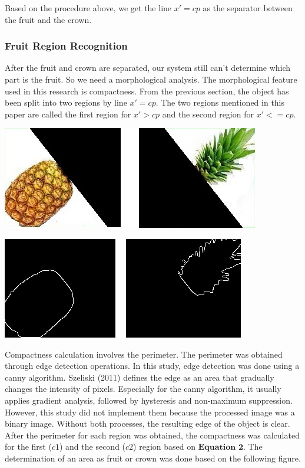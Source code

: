 \documentclass[11pt]{article}
\begin{document}
\begin{linenumbers}
Based on the procedure above, we get the line \(x '= cp\) as the separator between the fruit and the crown. 

\subsubsection{Fruit Region Recognition}
After the fruit and crown are separated, our system still can't determine which part is the fruit. So we need a morphological analysis. The morphological feature used in this research is compactness. From the previous section, the object has been split into two regions by line \(x '= cp\). The two regions mentioned in this paper are called the first region for \(x '> cp\) and the second region for \(x' <= cp\). 
\begin{multicols}{2}
	\begin{center}
		\includegraphics[scale=0.5]{images/region1and2}
	\end{center}
	\begin{center}
		\includegraphics[scale=0.5]{images/image_gradient}
	\end{center}
\end{multicols}

Compactness calculation involves the perimeter. The perimeter was obtained through edge detection operations. In this study, edge detection was done using a canny algorithm. Szeliski (2011) \cite{Szeliski:2011} defines the edge as an area that gradually changes the intensity of pixels. Especially for the canny algorithm, it usually applies gradient analysis, followed by hysteresis and non-maximum suppression. However, this study did not implement them because the processed image was a binary image. Without both processes, the resulting edge of the object is clear. After the perimeter for each region was obtained, the compactness was calculated for the first (\(c1\)) and the second (\(c2\)) region based on \(\textbf{Equation 2}\). The determination of an area as fruit or crown was done based on the following figure.


\end{linenumbers}
\end{document}
